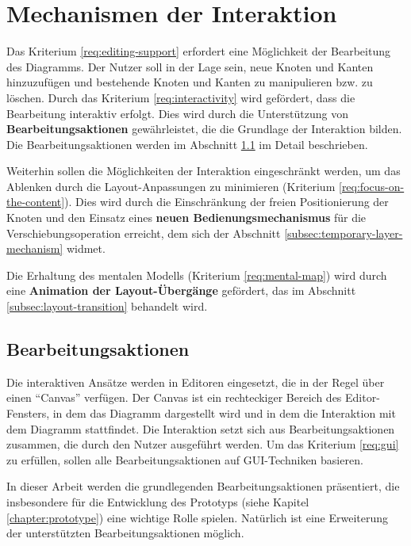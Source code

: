 \section{Mechanismen der Interaktion}
\label{sec:interaction-mechanisms}

Das Kriterium \ref{req:editing-support} erfordert eine Möglichkeit der Bearbeitung des Diagramms. Der Nutzer soll in der Lage sein, neue Knoten und Kanten hinzuzufügen und bestehende Knoten und Kanten zu manipulieren bzw. zu löschen. Durch das Kriterium \ref{req:interactivity} wird gefördert, dass die Bearbeitung interaktiv erfolgt. Dies wird durch die Unterstützung von \textbf{Bearbeitungsaktionen} gewährleistet, die die Grundlage der Interaktion bilden. Die Bearbeitungsaktionen werden im Abschnitt \ref{subsec:edit-actions} im Detail beschrieben.

Weiterhin sollen die Möglichkeiten der Interaktion eingeschränkt werden, um das Ablenken durch die Layout-Anpassungen zu minimieren (Kriterium \ref{req:focus-on-the-content}). Dies wird durch die Einschränkung der freien Positionierung der Knoten und den Einsatz eines \textbf{neuen Bedienungsmechanismus} für die Verschiebungsoperation erreicht, dem sich der Abschnitt \ref{subsec:temporary-layer-mechanism} widmet.

Die Erhaltung des mentalen Modells (Kriterium \ref{req:mental-map}) wird durch eine \textbf{Animation der Layout-Übergänge} gefördert, das im Abschnitt \ref{subsec:layout-transition} behandelt wird.


\subsection{Bearbeitungsaktionen}
\label{subsec:edit-actions}

Die interaktiven Ansätze werden in Editoren eingesetzt, die in der Regel über einen \enquote{Canvas} verfügen. Der Canvas ist ein rechteckiger Bereich des Editor-Fensters, in dem das Diagramm dargestellt wird und in dem die Interaktion mit dem Diagramm stattfindet. Die Interaktion setzt sich aus Bearbeitungsaktionen zusammen, die durch den Nutzer ausgeführt werden. Um das Kriterium \ref{req:gui} zu erfüllen, sollen alle Bearbeitungsaktionen auf GUI-Techniken basieren.

In dieser Arbeit werden die grundlegenden Bearbeitungsaktionen präsentiert, die insbesondere für die Entwicklung des Prototyps (siehe Kapitel \ref{chapter:prototype}) eine wichtige Rolle spielen. Natürlich ist eine Erweiterung der unterstützten Bearbeitungsaktionen möglich.

